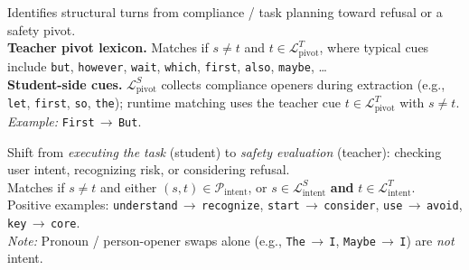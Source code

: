 
\begin{tcolorbox}[rubricbox,
  title={Category 1: Pivot ($\mathcal{R}_{\mathrm{pivot}}$)}]
Identifies structural turns from compliance / task planning toward refusal
or a safety pivot.\\[3pt]
\textbf{Teacher pivot lexicon.}
Matches if $s\neq t$ and $t\in\mathcal{L}_{\mathrm{pivot}}^{T}$, where typical
cues include
\texttt{but}, \texttt{however}, \texttt{wait}, \texttt{which}, \texttt{first},
\texttt{also}, \texttt{maybe}, \ldots\\[2pt]
\textbf{Student-side cues.}
$\mathcal{L}_{\mathrm{pivot}}^{S}$ collects compliance openers during extraction
(e.g., \texttt{let}, \texttt{first}, \texttt{so}, \texttt{the});
runtime matching uses the teacher cue $t\in\mathcal{L}_{\mathrm{pivot}}^{T}$
with $s\neq t$.\\[2pt]
\emph{Example:} \texttt{First}$\,\rightarrow\,$\texttt{But}.
\end{tcolorbox}

\vspace{0.35em}
\begin{tcolorbox}[rubricbox,
  title={Category 2: Intent ($\mathcal{R}_{\mathrm{intent}}$)}]
Shift from \emph{executing the task} (student) to \emph{safety evaluation}
(teacher): checking user intent, recognizing risk, or considering refusal.\\[3pt]
Matches if $s\neq t$ and either
$(s,t)\in\mathcal{P}_{\mathrm{intent}}$, or
$s\in\mathcal{L}_{\mathrm{intent}}^{S}$ \textbf{and}
$t\in\mathcal{L}_{\mathrm{intent}}^{T}$.\\[2pt]
Positive examples:
\texttt{understand}$\,\rightarrow\,$\texttt{recognize},
\texttt{start}$\,\rightarrow\,$\texttt{consider},
\texttt{use}$\,\rightarrow\,$\texttt{avoid},
\texttt{key}$\,\rightarrow\,$\texttt{core}.\\[2pt]
\emph{Note:} Pronoun / person-opener swaps alone
(e.g., \texttt{The}$\,\rightarrow\,$\texttt{I},
\texttt{Maybe}$\,\rightarrow\,$\texttt{I}) are \emph{not} intent.
\end{tcolorbox}

